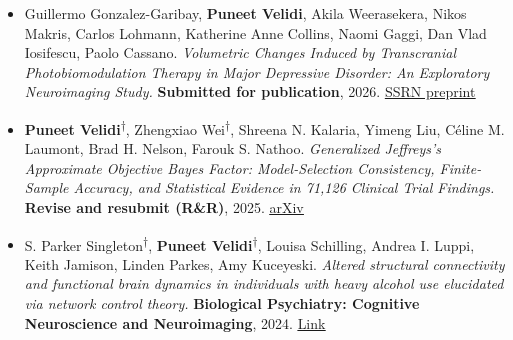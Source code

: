 \documentclass[letterpaper,11pt]{article}
\newenvironment{cvlist}
  {\begin{itemize}[leftmargin=0.15in, label={}, itemsep=2pt, parsep=0pt, topsep=2pt]\small}
  {\end{itemize}}
\newcommand{\status}[1]{\textbf{#1}}
\newcommand{\jfa}{\textsuperscript{$\dagger$}}
\begin{document}
\begin{cvlist}
\item Guillermo Gonzalez-Garibay, \textbf{Puneet Velidi}, Akila Weerasekera, Nikos Makris, Carlos Lohmann, Katherine Anne Collins, Naomi Gaggi, Dan Vlad Iosifescu, Paolo Cassano.
\textit{Volumetric Changes Induced by Transcranial Photobiomodulation Therapy in Major Depressive Disorder: An Exploratory Neuroimaging Study.}
\status{Submitted for publication}, 2026. \href{https://papers.ssrn.com/abstract=7480518}{\underline{SSRN preprint}}

\item \textbf{Puneet Velidi}\jfa, Zhengxiao Wei\jfa, Shreena N. Kalaria, Yimeng Liu, C\'eline M. Laumont, Brad H. Nelson, Farouk S. Nathoo.
\textit{Generalized Jeffreys's Approximate Objective Bayes Factor: Model-Selection Consistency, Finite-Sample Accuracy, and Statistical Evidence in 71{,}126 Clinical Trial Findings.}
\status{Revise and resubmit (R\&R)}, 2025. \href{https://arxiv.org/abs/2510.10358}{\underline{arXiv}}

\item S. Parker Singleton\jfa, \textbf{Puneet Velidi}\jfa, Louisa Schilling, Andrea I. Luppi, Keith Jamison, Linden Parkes, Amy Kuceyeski.
\textit{Altered structural connectivity and functional brain dynamics in individuals with heavy alcohol use elucidated via network control theory.}
\textbf{Biological Psychiatry: Cognitive Neuroscience and Neuroimaging}, 2024.
\href{https://www.biologicalpsychiatrycnni.org/article/S2451-9022(24)00139-3/abstract}{\underline{Link}}
\end{cvlist}

\end{document}
